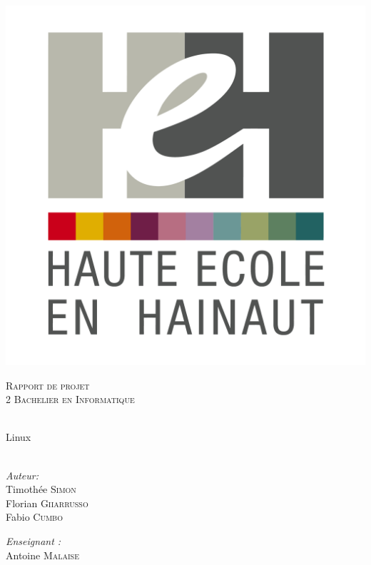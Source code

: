 \begin{center}
  \includegraphics[scale=0.12]{textures/logo/heh.pdf}

  \vspace{1cm}

  \textsc{\LARGE Rapport de projet} \\ [1cm]

  \textsc{\large 2 Bachelier en Informatique} \\ [0.2cm]

  \begingroup
   \selectfont 

  \HRule \\ [0.4cm] {
    \huge Linux \\ [0.2cm] 
  }
  \HRule \\ [1.3cm]
  \endgroup

  \begin{minipage}[t]{0.4 \textwidth} 
    \begin{flushleft} 
      \large \emph{Auteur:} \\ 
	  Timothée \textsc{Simon}\\
	  Florian \textsc{Giiarrusso}\\
	  Fabio \textsc{Cumbo}\\
    \end{flushleft} 
  \end{minipage}
  \begin{minipage}[t]{0.4 \textwidth}
    \begin{flushright} 
      \large \emph{Enseignant :} \\ 
      Antoine \textsc{Malaise}
    \end{flushright} 
  \end{minipage}


\end{center}
